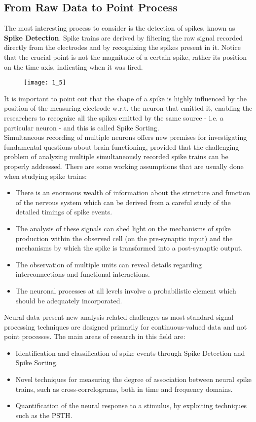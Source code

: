\subsection{From Raw Data to Point Process}
The most interesting process to consider is the detection of 
spikes, known as \textbf{Spike Detection}.
Spike trains are derived by filtering the raw signal recorded directly from the 
electrodes and by recognizing the spikes present in it. Notice that the 
crucial point is not the magnitude of a certain spike, rather its position 
on the time axis, indicating when it was fired.
\begin{figure}[H]
    \texttt{[image: 1\_5]}
    \centering
\end{figure}
It is important to point out that the shape of a spike is highly 
influenced by the position of the measuring electrode w.r.t. the neuron 
that emitted it, enabling the researchers to recognize all the spikes 
emitted by the same source - i.e. a
particular neuron - and this is called Spike Sorting.\\
Simultaneous recording of multiple neurons offers new premises for 
investigating fundamental questions about brain functioning, provided that 
the challenging problem of analyzing multiple simultaneously recorded 
spike trains can be properly addressed.
There are some working assumptions that are usually done when studying 
spike trains:
\begin{itemize}
    \item There is an enormous wealth of information about the structure 
and function of the nervous system which can be derived from a careful study 
of the detailed timings of spike events. 
    \item The analysis of these signals can shed light on the mechanisms of 
spike production within the observed cell (on the pre-synaptic input) and 
the mechanisms by which the spike is transformed into a post-synaptic 
output.
    \item The observation of multiple units can reveal details regarding
interconnections and functional interactions.
    \item The neuronal processes at all levels involve a probabilistic element 
which should be adequately incorporated. 
\end{itemize}

Neural data present new analysis-related challenges as most standard signal 
processing techniques are designed primarily for continuous-valued data 
and not point processes. 
The main areas of research in this field are:
\begin{itemize}
    \item Identification and classification of spike events through Spike 
Detection and Spike Sorting.
    \item Novel techniques for measuring the degree of association between neural spike trains,
such as cross-correlograms, both in time and frequency domains. 
    \item Quantification of the neural response to a stimulus, by exploiting
techniques such as the PSTH.
\end{itemize}

